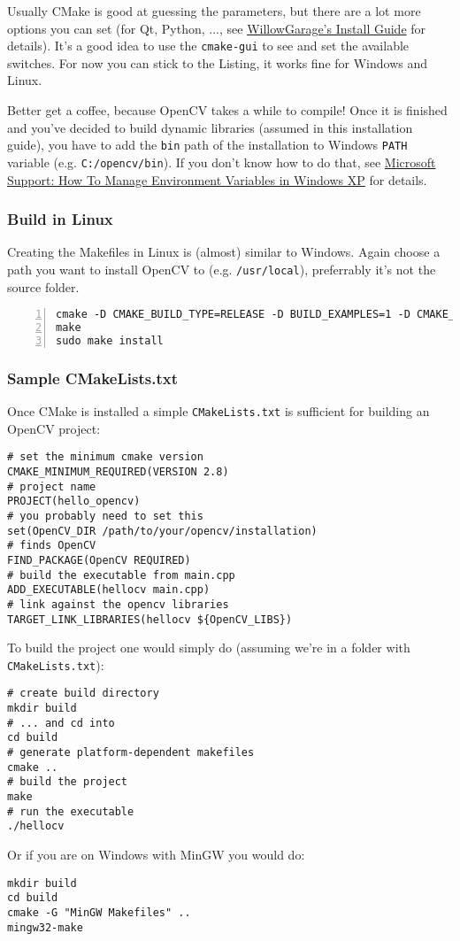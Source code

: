 Usually CMake is good at guessing the parameters, but there are a lot more options you can set (for Qt, Python, ..., see \href{http://opencv.willowgarage.com/wiki/InstallGuide}{WillowGarage's Install Guide} for details). It's a good idea to use the \lstinline|cmake-gui| to see and set the available switches. For now you can stick to the Listing, it works fine for Windows and Linux.

Better get a coffee, because OpenCV takes a while to compile! Once it is finished and you've decided to build dynamic libraries (assumed in this installation guide), you have to add the \lstinline|bin| path of the installation to Windows \lstinline|PATH| variable (e.g. \lstinline|C:/opencv/bin|). If you don't know how to do that, see \href{http://support.microsoft.com/kb/310519}{Microsoft Support: How To Manage Environment Variables in Windows XP} for details.

\subsubsection*{Build in Linux}
Creating the Makefiles in Linux is (almost) similar to Windows. Again choose a path you want to install OpenCV to (e.g. \lstinline|/usr/local|), preferrably it's not the source folder.

\begin{lstlisting}[numberstyle=\footnotesize, numbers=left]
cmake -D CMAKE_BUILD_TYPE=RELEASE -D BUILD_EXAMPLES=1 -D CMAKE_INSTALL_PREFIX=/usr/local ..
make 
sudo make install
\end{lstlisting}

\subsubsection*{Sample CMakeLists.txt}
Once CMake is installed a simple \lstinline|CMakeLists.txt| is sufficient for building an OpenCV project:

\lstset{
	language=cmake,
}
\begin{lstlisting}
# set the minimum cmake version 
CMAKE_MINIMUM_REQUIRED(VERSION 2.8)
# project name
PROJECT(hello_opencv)
# you probably need to set this
set(OpenCV_DIR /path/to/your/opencv/installation)
# finds OpenCV
FIND_PACKAGE(OpenCV REQUIRED)
# build the executable from main.cpp
ADD_EXECUTABLE(hellocv main.cpp)
# link against the opencv libraries
TARGET_LINK_LIBRARIES(hellocv ${OpenCV_LIBS})
\end{lstlisting}

To build the project one would simply do (assuming we're in a folder with \lstinline|CMakeLists.txt|):

\lstset{
	language=sh,
}
\begin{lstlisting}
# create build directory 
mkdir build
# ... and cd into
cd build
# generate platform-dependent makefiles
cmake ..
# build the project
make
# run the executable
./hellocv
\end{lstlisting}

Or if you are on Windows with MinGW you would do:

\begin{lstlisting}
mkdir build
cd build
cmake -G "MinGW Makefiles" ..
mingw32-make
\end{lstlisting}
